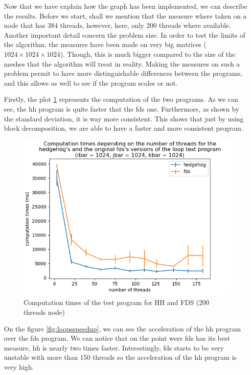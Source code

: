 Now that we have explain how the graph has been implemented, we can describe the
results. Before we start, shall we mention that the measure where taken on a
node that has 384 threads, however, here, only 200 threads where available.
Another important detail concern the problem size. In order to test the limits
of the algorithm, the measures have been made on very big matrices
($1024\times1024\times1024$). Though, this is much bigger compared to the size
of the meshes that the algorithm will treat in reality. Making the measures on
such a problem permit to have more distinguishable differences between the
programs, and this allows as well to see if the program scales or not.

Firstly, the plot \ref{fig:loopscomptime} represents the computation of the two
programs. As we can see, the \gls{hh} program is quite faster that the
\gls{fds} one. Furthermore, as shown by the standard deviation, it is way more
consistent. This shows that just by using block decomposition, we are able to
have a faster and more consistent program.
\clearpage{}

\begin{figure}[ht!]
  \begin{center}
    \includegraphics[scale=0.6]{img/fds-loops/times.png}
    \caption{Computation times of the test program for HH and FDS (200 threads node)}
    \label{fig:loopscomptime}
  \end{center}
\end{figure}

On the figure \ref{fig:loopsspeedup}, we can see the acceleration of the
\gls{hh} program over the \gls{fds} program. We can notice that on the point
were \gls{fds} has its best measure, \gls{hh} is nearly two times faster.
Interestingly, \gls{fds} starts to be very unstable with more than 150 threads
so the acceleration of the \gls{hh} program is very high.

